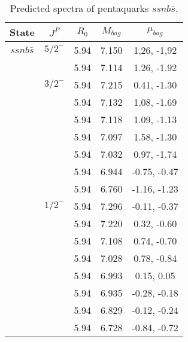 \documentclass[prd,twocolumn,floatfix,nofootinbib]{revtex4}
\begin{document}
\renewcommand{\tabcolsep}{0.5cm}
\renewcommand{\arraystretch}{1.2}
\begin{table*}[!htbp]
    \caption{Predicted spectra of pentaquarks $ssnb\bar{s}$.}
    \begin{tabular}{ccccc}
        \hline\hline
        {\rm State} &$J^{P}$ &$R_{0}$ &$M_{bag}$ &$\mu_{bag}$ \\ \hline
        $ssnb\bar{s}$
            &${5/2}^{-}$    &5.94   &7.150  &1,26, -1,92 \\
            &               &5.94   &7.114  &1.26, -1.92 \\
            &${3/2}^{-}$    &5.94   &7.215  &0.41, -1.30 \\
            &               &5.94   &7.132  &1.08, -1.69 \\
            &               &5.94   &7.118  &1.09, -1.13 \\
            &               &5.94   &7.097  &1.58, -1.30 \\
            &               &5.94   &7.032  &0.97, -1.74 \\
            &               &5.94   &6.944  &-0.75, -0.47 \\
            &               &5.94   &6.760  &-1.16, -1.23 \\
            &${1/2}^{-}$    &5.94   &7.296  &-0.11, -0.37 \\
            &               &5.94   &7.220  &0.32, -0.60 \\
            &               &5.94   &7.108  &0.74, -0.70 \\
            &               &5.94   &7.028  &0.78, -0.84 \\
            &               &5.94   &6.993  &0.15, 0.05 \\
            &               &5.94   &6.935  &-0.28, -0.18 \\
            &               &5.94   &6.829  &-0.12, -0.24 \\
            &               &5.94   &6.728  &-0.84, -0.72 \\  
        \hline\hline
    \end{tabular}
\end{table*}
\end{document}

